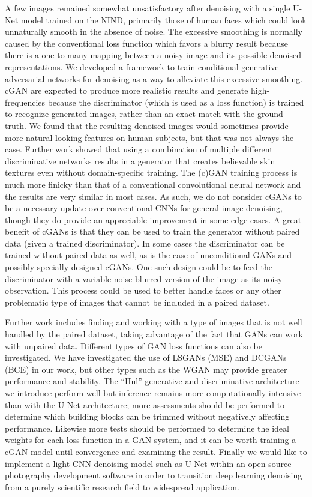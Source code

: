 A few images remained somewhat unsatisfactory after denoising with a single U-Net model trained on the \ac{NIND}, primarily those of human faces which could look unnaturally smooth in the absence of noise. The excessive smoothing is normally caused by the conventional loss function which favors a blurry result because there is a one-to-many mapping between a noisy image and its possible denoised representations. We developed a framework to train conditional generative adversarial networks for denoising as a way to alleviate this excessive smoothing. \ac{cGAN} are expected to produce more realistic results and generate high-frequencies because the discriminator (which is used as a loss function) is trained to recognize generated images, rather than an exact match with the ground-truth. We found that the resulting denoised images would sometimes provide more natural looking features on human subjects, but that was not always the case. Further work showed that using a combination of multiple different discriminative networks results in a generator that creates believable skin textures even without domain-specific training. The (c)\ac{GAN} training process is much more finicky than that of a conventional convolutional neural network and the results are very similar in most cases. As such, we do not consider \acp{cGAN} to be a necessary update over conventional \acp{CNN} for general image denoising, though they do provide an appreciable improvement in some edge cases. A great benefit of \acp{cGAN} is that they can be used to train the generator without paired data (given a trained discriminator). In some cases the discriminator can be trained without paired data as well, as is the case of unconditional \acp{GAN} and possibly specially designed \acp{cGAN}. One such design could be to feed the discriminator with a variable-noise blurred version of the image as its noisy observation. This process could be used to better handle faces or any other problematic type of images that cannot be included in a paired dataset.

Further work includes finding and working with a type of images that is not well handled by the paired dataset, taking advantage of the fact that \acp{GAN} can work with unpaired data. Different types of \ac{GAN} loss functions can also be investigated. We have investigated the use of \acp{LSGAN} (\ac{MSE}) and \acp{DCGAN} (\ac{BCE}) in our work, but other types such as the \ac{WGAN} may provide greater performance and stability. The ``Hul'' generative and discriminative architecture we introduce perform well but inference remains more computationally intensive than with the U-Net architecture; more assessments should be performed to determine which building blocks can be trimmed without negatively affecting performance. Likewise more tests should be performed to determine the ideal weights for each loss function in a \ac{GAN} system, and it can be worth training a \ac{cGAN} model until convergence and examining the result. Finally we would like to implement a light \ac{CNN} denoising model such as U-Net within an open-source photography development software in order to transition deep learning denoising from a purely scientific research field to widespread application.


